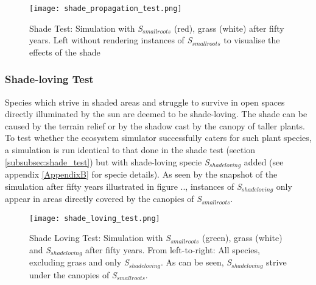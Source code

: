 \begin{figure}
\center
	\texttt{[image: shade\_propagation\_test.png]}
	\caption{ Shade Test: Simulation with \textit{S$_{smallroots}$} (red), grass (white) after fifty years. Left without rendering instances of \textit{S$_{smallroots}$} to visualise the effects of the shade}
	\label{fig:shade_test}
\end{figure}

\subsubsection{Shade-loving Test} \label{subsubsec:shade_loving_test}

Species which strive in shaded areas and struggle to survive in open spaces directly illuminated by the sun are deemed to be shade-loving. The shade can be caused by the terrain relief or by the shadow cast by the canopy of taller plants. To test whether the ecosystem simulator successfully caters for such plant species, a simulation is run identical to that done in the shade test (section \ref{subsubsec:shade_test}) but with shade-loving specie \textit{S$_{shadeloving}$} added (see appendix \ref{AppendixB} for specie details). As seen by the snapshot of the simulation after fifty years illustrated in figure .., instances of \textit{S$_{shadeloving}$} only appear in areas directly covered by the canopies of \textit{S$_{smallroots}$}.

\begin{figure}
\center
	\texttt{[image: shade\_loving\_test.png]}
	\caption{ Shade Loving Test: Simulation with \textit{S$_{smallroots}$} (green), grass (white) and \textit{S$_{shadeloving}$} after fifty years. From left-to-right: All species, excluding grass and only \textit{S$_{shadeloving}$}. As can be seen, \textit{S$_{shadeloving}$} strive under the canopies of \textit{S$_{smallroots}$}.}
	\label{fig:shade_loving_test}
\end{figure}

